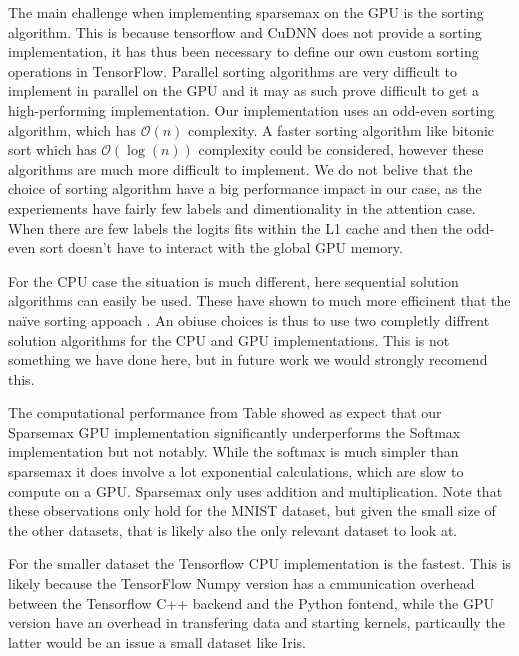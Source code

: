 The main challenge when implementing sparsemax on the GPU is the sorting algorithm. This is because tensorflow and CuDNN does not provide a sorting implementation, it has thus been necessary to define our own custom sorting operations in TensorFlow. Parallel sorting algorithms are very difficult to implement in parallel on the GPU and it may as such prove difficult to get a high-performing implementation. Our implementation uses an odd-even sorting algorithm, which has $\mathcal{O}(n)$ complexity. A faster sorting algorithm like bitonic sort which has $\mathcal{O}(\log(n))$ complexity could be considered, however these algorithms are much more difficult to implement. We do not belive that the choice of sorting algorithm have a big performance impact in our case, as the experiements have fairly few labels and dimentionality in the attention case. When there are few labels the logits fits within the L1 cache and then the odd-even sort doesn't have to interact with the global GPU memory. 

For the CPU case the situation is much different, here sequential solution algorithms can easily be used. These have shown to much more efficinent that the naïve sorting appoach \cite{Liu2016}. An obiuse choices is thus to use two completly diffrent solution algorithms for the CPU and GPU implementations. This is not something we have done here, but in future work we would strongly recomend this.

The computational performance from Table \label{tab:timings} showed as expect that our Sparsemax GPU implementation significantly underperforms the Softmax implementation but not notably. While the softmax is much simpler than sparsemax it does involve a lot exponential calculations, which are slow to compute on a GPU. Sparsemax only uses addition and multiplication. Note that these observations only hold for the MNIST dataset, but given the small size of the other datasets, that is likely also the only relevant dataset to look at.

For the smaller dataset the Tensorflow CPU implementation is the fastest. This is likely because the TensorFlow Numpy version has a cmmunication overhead between the Tensorflow C++ backend and the Python fontend, while the GPU version have an overhead in transfering data and starting kernels, particaully the latter would be an issue a small dataset like Iris.

